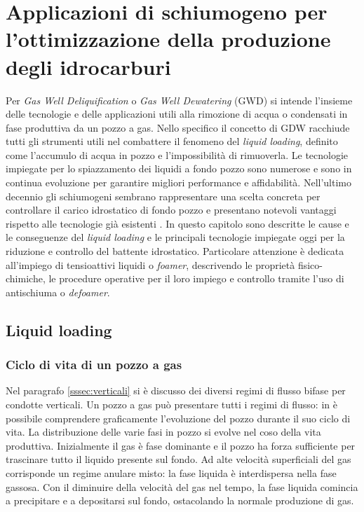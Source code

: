 \clearpage{\pagestyle{empty}\cleardoublepage}
\chapter{Applicazioni di schiumogeno per l'ottimizzazione della produzione degli idrocarburi}
Per \textit{Gas Well Deliquification} o \textit{Gas Well Dewatering} (GWD) si intende l'insieme delle tecnologie e delle applicazioni utili alla rimozione di acqua o condensati in fase produttiva da un pozzo a gas. Nello specifico il concetto di GDW racchiude tutti gli strumenti utili nel combattere il fenomeno del \textit{liquid loading}, definito come l'accumulo di acqua in pozzo e l'impossibilità di rimuoverla. Le tecnologie impiegate per lo spiazzamento dei liquidi a fondo pozzo sono numerose e sono in continua evoluzione per garantire migliori performance e affidabilità. Nell'ultimo decennio gli schiumogeni sembrano rappresentare una scelta concreta per controllare il carico idrostatico di fondo pozzo e presentano notevoli vantaggi rispetto alle tecnologie già esistenti \parencite{stanculescu2014gwd}. In questo capitolo sono descritte le cause e le conseguenze del \textit{liquid loading} e le principali tecnologie impiegate oggi per la riduzione e controllo del battente idrostatico. Particolare attenzione è dedicata all'impiego di tensioattivi liquidi o \textit{foamer}, descrivendo le proprietà fisico-chimiche, le procedure operative per il loro impiego e controllo tramite l'uso di antischiuma o  \textit{defoamer}.

\section{Liquid loading}
\subsection{Ciclo di vita di un pozzo a gas}
Nel paragrafo \ref{sssec:verticali} si è discusso dei diversi regimi di flusso bifase per condotte verticali. Un pozzo a gas può presentare tutti i regimi di flusso: in  è possibile comprendere graficamente l'evoluzione del pozzo durante il suo ciclo di vita. La distribuzione delle varie fasi in pozzo si evolve nel coso della vita produttiva. Inizialmente il gas è fase dominante e il pozzo ha forza sufficiente per trascinare tutto il liquido presente sul fondo. Ad alte velocità superficiali del gas corrisponde un regime anulare misto: la fase liquida è interdispersa nella fase gassosa. Con il diminuire della velocità del gas nel tempo, la fase liquida comincia a precipitare e a depositarsi sul fondo, ostacolando la normale produzione di gas.

